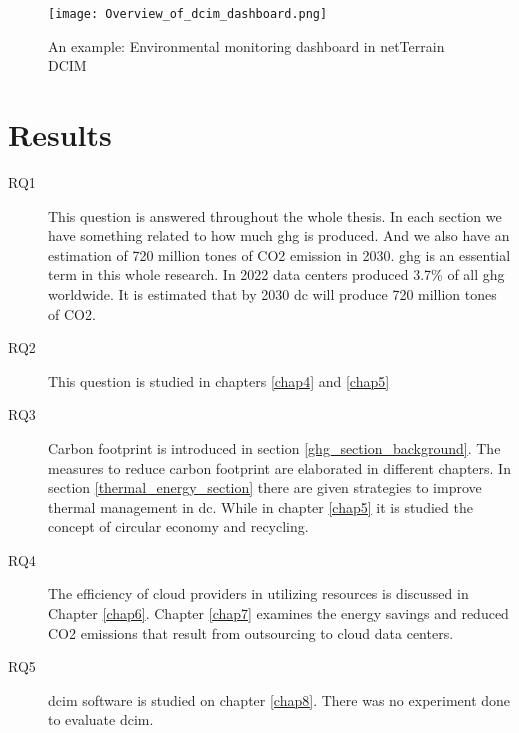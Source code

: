 \documentclass[
  a4paper,  %
  twoside,  %
  bibliography=totoc,
  headsepline,
  cleardoublepage=empty,
  parskip=half,
  draft=false
]{scrbook}
\begin{document}
\begin{figure}
	\centering
	\texttt{[image: Overview\_of\_dcim\_dashboard.png]}
	\caption{An example: Environmental monitoring dashboard in netTerrain DCIM\cite{graphicalnetworksLoweringYour}}
	\label{dcim_dashboard}
\end{figure}


\chapter{Results}

\begin{description}
	\item[RQ1]
	
	This question is answered throughout the whole thesis. In each section we have something related to how much \gls{ghg} is produced. And we also have an estimation of 720 million tones of CO2 emission in 2030.
	\gls{ghg} is an essential term in this whole research. In 2022 data centers produced 3.7\% of all \gls{ghg} worldwide. It is estimated that by 2030 \gls{dc} will produce 720 million tones of CO2.
	
	\item[RQ2]
	
	This question is studied in chapters \ref{chap4} and \ref{chap5}
	
	\item[RQ3] 
	
	Carbon footprint is introduced in section \ref{ghg_section_background}. The measures to reduce carbon footprint are elaborated in different chapters. In section \ref{thermal_energy_section} there are given strategies to improve thermal management in \gls{dc}. While in chapter \ref{chap5} it is studied the concept of circular economy and recycling.
	
	\item[RQ4] 
	
	The efficiency of cloud providers in utilizing resources is discussed in Chapter \ref{chap6}. Chapter \ref{chap7} examines the energy savings and reduced CO2 emissions that result from outsourcing to cloud data centers.
	
	\item[RQ5] 
	
	\gls{dcim} software is studied on chapter \ref{chap8}. There was no experiment done to evaluate \gls{dcim}.
	
\end{description}
\end{document}
